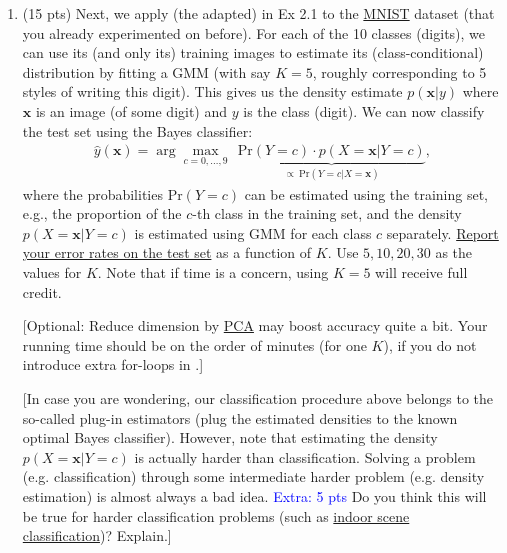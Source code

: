 \documentclass[10pt,letter,notitlepage]{article}
\newcommand{\xv}{\mathbf{x}}
\newcommand{\red}[1]{{\color{red}#1}}
\newcommand{\magenta}[1]{{\color{magenta}#1}}
\newcommand{\eg}{{e.g.}\xspace}
\newcounter{exercise}
\begin{document}
\begin{exercise}
\begin{enumerate}
		\item (15 pts) Next, we apply (the adapted)  in Ex 2.1 to the \href{http://yann.lecun.com/exdb/mnist/}{\magenta{MNIST}} dataset (that you already experimented on before). For each of the 10 classes (digits), we can use its (and only its) training images to estimate its (class-conditional) distribution by fitting a GMM (with say $K=5$, roughly corresponding to 5 styles of writing this digit). This gives us the density estimate $p(\xv | y)$ where $\xv$ is an image (of some digit) and $y$ is the class (digit). We can now classify the test set using the Bayes classifier:
		\begin{align}
		\hat y(\xv) = \arg\max_{c = 0, \ldots, 9} ~~ \underbrace{\mathrm{Pr}(Y = c) \cdot p(X = \xv | Y = c)}_{\propto ~\mathrm{Pr}(Y=c | X=\xv)},
		\end{align}
		where the probabilities $\mathrm{Pr}(Y = c)$ can be estimated using the training set, \eg, the proportion of the $c$-th class in the training set, and the \red{density} $p(X = \xv | Y = c)$ is estimated using GMM for each class $c$ separately. \underline{Report your error rates on the test set} as a function of $K$. Use $5, 10, 20, 30$ as the values for $K$. Note that if time is a concern, using $K=5$ will receive full credit. 
		
		[Optional: Reduce dimension by \href{https://en.wikipedia.org/wiki/Principal_component_analysis}{\magenta{PCA}} may boost accuracy quite a bit. Your running time should be on the order of minutes (for one  $K$), if you do not introduce extra for-loops in .]
		
		[In case you are wondering, our classification procedure above belongs to the so-called plug-in estimators (plug the estimated densities to the known optimal Bayes classifier). However, note that estimating the density $p(X=\xv | Y = c)$ is actually harder than classification. Solving a problem (\eg classification) through some intermediate harder problem (\eg density estimation) is almost always a bad idea. \textcolor{blue}{Extra: 5 pts} Do you think this will be true for harder classification problems (such as \href{https://arxiv.org/pdf/1911.00155.pdf}{\magenta{indoor scene classification}})? Explain.]
		

	\end{enumerate}	
\end{exercise}
\end{document}
